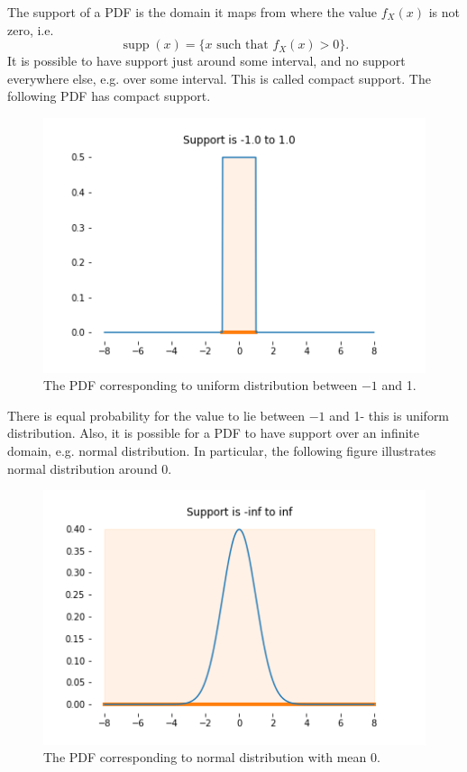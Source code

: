 \documentclass[a4paper, openany]{memoir}
\begin{document}
The support of a PDF is the domain it maps from where the value $f_X(x)$ is not zero, i.e.
\[\operatorname{supp}(x) = \{ x \text{ such that } f_X(x) > 0\}.\]
It is possible to have support just around some interval, and no support everywhere else, e.g. over some interval. This is called compact support. The following PDF has compact support.
\begin{figure}[H]
    \centering
    \includegraphics[scale=0.5]{src/5.14 compact support.png}
    \caption{The PDF corresponding to uniform distribution between $-1$ and 1.}
\end{figure}
\noindent There is equal probability for the value to lie between $-1$ and 1- this is uniform distribution. Also, it is possible for a PDF to have support over an infinite domain, e.g. normal distribution. In particular, the following figure illustrates normal distribution around 0.
\begin{figure}[H]
    \centering
    \includegraphics[scale=0.5]{src/5.13 infinite support.png}
    \caption{The PDF corresponding to normal distribution with mean 0.}
\end{figure}
\end{document}

